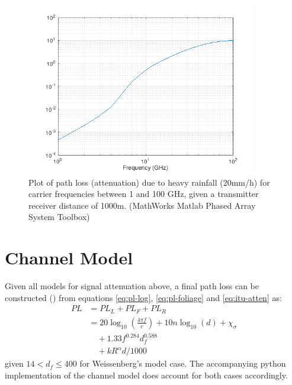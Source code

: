 \begin{figure}[htb]
    \begin{center}
        \includegraphics[width=0.9\textwidth]{smba_itu_rainfall}
        \caption{Plot of path loss (attenuation) due to heavy rainfall (20mm/h) for carrier frequencies between 1 and 100 GHz, 
        given a transmitter receiver distance of 1000m. (MathWorks Matlab Phased Array System Toolbox)}
        \label{fig:itu_rainfall}
    \end{center}
\end{figure}

\section{Channel Model}
Given all models for signal attenuation above, a final path loss can be constructed (\cite{tse2005fundamentals}) from equations 
\ref{eq:pl-log}, \ref{eq:pl-foliage} and \ref{eq:itu-atten} as: 
\begin{equation} \label{eq:pl-sum}
    \begin{split}
        PL & = PL_L + PL_F + PL_R \\
             & = 20 \log_{10} (\frac{4 \pi f}{c}) + 10 n \log_{10}(d) + \chi_{\sigma} \\
             & \quad + 1.33 f^{0.284} d_f^{0.588} \\
             & \quad + k R^{\alpha} d / 1000
    \end{split}
\end{equation}
given $14 < d_f \leq 400$ for Weissenberg's model case. The accompanying python implementation of the channel 
model does account for both cases accordingly. 

